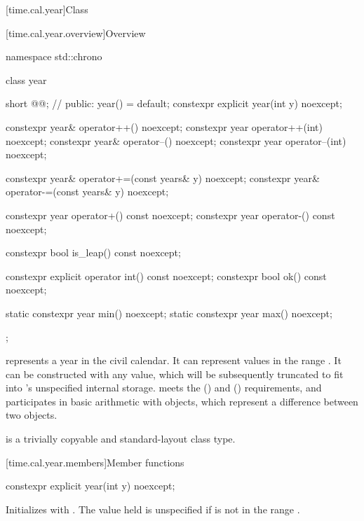 [time.cal.year]{Class }

[time.cal.year.overview]{Overview}

\begin{codeblock}
namespace std::chrono {
  class year {
    short @@;                   // \expos
  public:
    year() = default;
    constexpr explicit year(int y) noexcept;

    constexpr year& operator++()    noexcept;
    constexpr year  operator++(int) noexcept;
    constexpr year& operator--()    noexcept;
    constexpr year  operator--(int) noexcept;

    constexpr year& operator+=(const years& y) noexcept;
    constexpr year& operator-=(const years& y) noexcept;

    constexpr year operator+() const noexcept;
    constexpr year operator-() const noexcept;

    constexpr bool is_leap() const noexcept;

    constexpr explicit operator int() const noexcept;
    constexpr bool ok() const noexcept;

    static constexpr year min() noexcept;
    static constexpr year max() noexcept;
  };
}
\end{codeblock}

\pnum
{} represents a year in the civil calendar.
It can represent values in the range .
It can be constructed with any  value,
which will be subsequently truncated to fit into 's unspecified internal storage.
 meets the  ()
and  () requirements,
and participates in basic arithmetic with  objects,
which represent a difference between two  objects.

\pnum
{} is a trivially copyable and standard-layout class type.

[time.cal.year.members]{Member functions}

%
\begin{itemdecl}
constexpr explicit year(int y) noexcept;
\end{itemdecl}

\begin{itemdescr}
\pnum
\effects
Initializes  with .
The value held is unspecified if  is not in the range .
\end{itemdescr}

